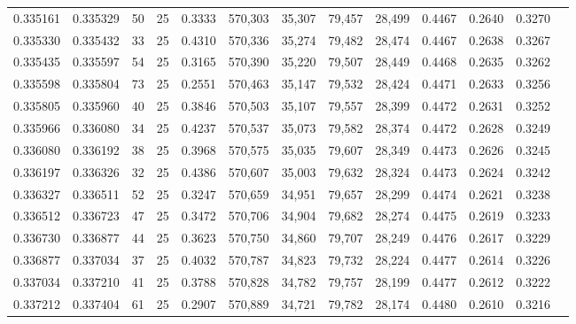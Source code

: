 \begin{tabular}{rrrrrrrrrrrrr}
0.335161 & 0.335329 &    50 &  25 &                                     0.3333 & 570,303 &  35,307 &  79,457 &  28,499 & 0.4467 & 0.2640 & 0.3270 \\
0.335330 & 0.335432 &    33 &  25 &                                     0.4310 & 570,336 &  35,274 &  79,482 &  28,474 & 0.4467 & 0.2638 & 0.3267 \\
0.335435 & 0.335597 &    54 &  25 &                                     0.3165 & 570,390 &  35,220 &  79,507 &  28,449 & 0.4468 & 0.2635 & 0.3262 \\
0.335598 & 0.335804 &    73 &  25 &                                     0.2551 & 570,463 &  35,147 &  79,532 &  28,424 & 0.4471 & 0.2633 & 0.3256 \\
0.335805 & 0.335960 &    40 &  25 &                                     0.3846 & 570,503 &  35,107 &  79,557 &  28,399 & 0.4472 & 0.2631 & 0.3252 \\
0.335966 & 0.336080 &    34 &  25 &                                     0.4237 & 570,537 &  35,073 &  79,582 &  28,374 & 0.4472 & 0.2628 & 0.3249 \\
0.336080 & 0.336192 &    38 &  25 &                                     0.3968 & 570,575 &  35,035 &  79,607 &  28,349 & 0.4473 & 0.2626 & 0.3245 \\
0.336197 & 0.336326 &    32 &  25 &                                     0.4386 & 570,607 &  35,003 &  79,632 &  28,324 & 0.4473 & 0.2624 & 0.3242 \\
0.336327 & 0.336511 &    52 &  25 &                                     0.3247 & 570,659 &  34,951 &  79,657 &  28,299 & 0.4474 & 0.2621 & 0.3238 \\
0.336512 & 0.336723 &    47 &  25 &                                     0.3472 & 570,706 &  34,904 &  79,682 &  28,274 & 0.4475 & 0.2619 & 0.3233 \\
0.336730 & 0.336877 &    44 &  25 &                                     0.3623 & 570,750 &  34,860 &  79,707 &  28,249 & 0.4476 & 0.2617 & 0.3229 \\
0.336877 & 0.337034 &    37 &  25 &                                     0.4032 & 570,787 &  34,823 &  79,732 &  28,224 & 0.4477 & 0.2614 & 0.3226 \\
0.337034 & 0.337210 &    41 &  25 &                                     0.3788 & 570,828 &  34,782 &  79,757 &  28,199 & 0.4477 & 0.2612 & 0.3222 \\
0.337212 & 0.337404 &    61 &  25 &                                     0.2907 & 570,889 &  34,721 &  79,782 &  28,174 & 0.4480 & 0.2610 & 0.3216 \\

\end{tabular}
